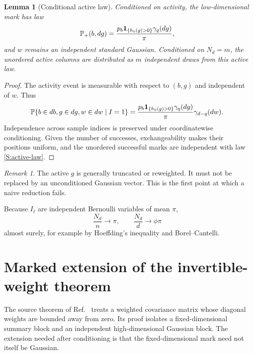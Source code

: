 \documentclass[
  aps,
  prl,
  10pt,
  onecolumn,
  longbibliography,
  nofootinbib
]{revtex4-2}
\newtheorem{lemma}[theorem]{Lemma}
\theoremstyle{remark}
\newtheorem{remark}[theorem]{Remark}
\begin{document}
\begin{lemma}[Conditional active law]
\label{S:active-law-lemma}
Conditioned on activity, the low-dimensional mark has law
\begin{equation}
\mathbb{P}_+(b,dg)=
\frac{p_b\mathbf{1}_{\{h_b(g)>0\}}\gamma_q(dg)}{\pi},
\label{S:active-law}
\end{equation}
and $w$ remains an independent standard Gaussian. Conditioned on $N_d=m$, the unordered active columns are distributed as $m$ independent draws from this active law.
\end{lemma}

\begin{proof}
The activity event is measurable with respect to $(b,g)$ and independent of $w$. Thus
\begin{equation}
\mathbb{P}\{b\in db,g\in dg,w\in dw\mid I=1\}
=
\frac{p_b\mathbf{1}_{\{h_b(g)>0\}}\gamma_q(dg)}{\pi}
\gamma_{d-q}(dw).
\end{equation}
Independence across sample indices is preserved under coordinatewise conditioning. Given the number of successes, exchangeability makes their positions uniform, and the unordered successful marks are independent with law \eqref{S:active-law}.
\end{proof}

\begin{remark}
The active $g$ is generally truncated or reweighted. It must not be replaced by an unconditioned Gaussian vector. This is the first point at which a naive reduction fails.
\end{remark}

Because $I_\ell$ are independent Bernoulli variables of mean $\pi$,
\begin{equation}
\frac{N_d}{n}\to\pi,\qquad
\frac{N_d}{d}\to\phi\pi
\label{S:active-ratios}
\end{equation}
almost surely, for example by Hoeffding's inequality and Borel--Cantelli.

\section{Marked extension of the invertible-weight theorem}

The source theorem of Ref.~\cite{BenArousEtAl2025} treats a weighted covariance matrix whose diagonal weights are bounded away from zero. Its proof isolates a fixed-dimensional summary block and an independent high-dimensional Gaussian block. The extension needed after conditioning is that the fixed-dimensional mark need not itself be Gaussian.
\end{document}
